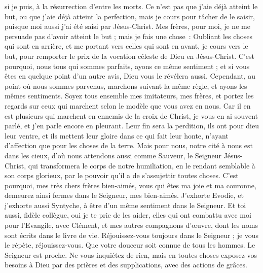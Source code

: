 \begin{multicols}{2}
si je puis, à la résurrection d’entre les morts.
Ce n’est pas que j'aie déjà atteint le but, ou que j’aie déjà atteint la perfection, mais je cours pour tâcher de le saisir, puisque moi aussi j'ai été saisi par Jésus-Christ.
Mes frères, pour moi, je ne me persuade pas d'avoir atteint le but ;
mais je fais une chose : Oubliant les choses qui sont en arrière, et me portant vers celles qui sont en avant, je cours vers le but, pour remporter le prix de la vocation céleste de Dieu en Jésus-Christ.
C'est pourquoi, nous tous qui sommes parfaits, ayons ce même sentiment ; et si vous êtes en quelque point d’un autre avis, Dieu vous le révélera aussi.
Cependant, au point où nous sommes parvenus, marchons suivant la même règle, et ayons les mêmes sentiments.
Soyez tous ensemble mes imitateurs, mes frères, et portez les regards sur ceux qui marchent selon le modèle que vous avez en nous.
Car il en est plusieurs qui marchent en ennemis de la croix de Christ, je vous en ai souvent parlé, et j’en parle encore en pleurant.
Leur fin sera la perdition, ils ont pour dieu leur ventre, et ils mettent leur gloire dans ce qui fait leur honte, n'ayant d'affection que pour les choses de la terre.
Mais pour nous, notre cité à nous est dans les cieux, d'où nous attendons aussi comme Sauveur, le Seigneur Jésus-Christ,
qui transformera le corps de notre humiliation, en le rendant semblable à son corps glorieux, par le pouvoir qu’il a de s’assujettir toutes choses.
\VerseOne{}C'est pourquoi, mes très chers frères bien-aimés, vous qui êtes ma joie et ma couronne, demeurez ainsi fermes dans le Seigneur, mes bien-aimés.
J’exhorte Evodie, et j’exhorte aussi Syntyche, à être d’un même sentiment dans le Seigneur.
Et toi aussi, fidèle collègue, oui je te prie de les aider, elles qui ont combattu avec moi pour l'Evangile, avec Clément, et mes autres compagnons d’œuvre, dont les noms sont écrits dans le livre de vie.
Réjouissez-vous toujours dans le Seigneur ; je vous le répète, réjouissez-vous.
Que votre douceur soit connue de tous les hommes. Le Seigneur est proche.
Ne vous inquiétez de rien, mais en toutes choses exposez vos besoins à Dieu par des prières et des supplications, avec des actions de grâces.

\end{multicols}
